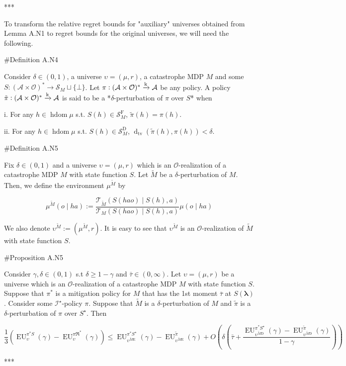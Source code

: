 \documentclass[a4paper]{article}
\newcommand{\AP}[1]{\left(#1\right)}
\newcommand{\Dtva}[1]{\operatorname{d}_{\text{tv}}\AP{#1}}
\newcommand{\Estr}{\boldsymbol{\lambda}}
\newcommand{\M}{\xrightarrow{\textnormal{k}}}
\newcommand{\Ob}{\mathcal{O}}
\newcommand{\A}{\mathcal{A}}
\newcommand{\St}{\mathcal{S}}
\newcommand{\T}{\mathcal{T}}
\newcommand{\In}{\mathcal{I}}
\newcommand{\FH}{(\A \times \Ob)^*}
\DeclareMathOperator{\HD}{hdom}
\newcommand{\RMD}{\mathrm{D}}
\newcommand{\RME}{\mathrm{E}}
\newcommand{\RMF}{\mathrm{F}}
\newcommand{\SF}{\St^{\RMF}}
\newcommand{\SD}{\St^{\RMD}}
\newcommand{\EU}{\operatorname{EU}}
\begin{document}
***

To transform the relative regret bounds for "auxiliary" universes obtained from Lemma A.N1 to regret bounds for the original universes, we will need the following.

\#Definition A.N4

Consider $\delta\in(0,1)$, a universe $\upsilon=(\mu,r)$, a catastrophe MDP $M$ and some $S: \FH \rightarrow \St_M \sqcup \{\bot\}$. Let $\pi: \FH \M \A$ be any policy. A policy $\tilde{\pi}: \FH \M \A$ is said to be a *$\delta$-perturbation of $\pi$ over $S$* when

i. For any $h \in \HD{\mu}$ s.t. $S(h)\in\SF_M$, $\tilde{\pi}(h)=\pi(h)$.

ii. For any $h \in \HD{\mu}$ s.t. $S(h)\in\SD_M$, $\Dtva{\tilde{\pi}(h),\pi(h)} < \delta$.

\#Definition A.N5

Fix $\delta\in(0,1)$ and a universe $\upsilon=(\mu,r)$ which is an $\Ob$-realization of a catastrophe MDP $M$ with state function $S$. Let $\tilde{M}$ be a $\delta$-perturbation of $M$. Then, we define the environment $\mu^{\tilde{M}}$ by

$$\mu^{\tilde{M}}(o \mid ha) := \frac{\T_{\tilde{M}}\AP{S(hao) \mid S(h),a}}{\T_{M}\AP{S(hao) \mid S(h),a}}\mu(o \mid ha)$$

We also denote $\upsilon^{\tilde{M}}:=\AP{\mu^{\tilde{M}},r}$. It is easy to see that $\upsilon^{\tilde{M}}$ is an $\Ob$-realization of $\tilde{M}$ with state function $S$.

\#Proposition A.N5

Consider $\gamma,\delta\in(0,1)$ s.t $\delta \geq 1 - \gamma$ and $\bar{\tau}\in(0,\infty)$. Let $\upsilon=(\mu,r)$ be a universe which is an $\Ob$-realization of a catastrophe MDP $M$ with state function $S$. Suppose that $\pi^*$ is a mitigation policy for $M$ that has the 1st moment $\bar{\tau}$ at $S(\Estr)$. Consider some $\In^\star$-policy $\pi$. Suppose that $\tilde{M}$ is a $\delta$-perturbation of $M$ and $\tilde{\pi}$ is a $\delta$-perturbation of $\pi$ over $S^\star$. Then

$$\frac{1}{3}\AP{\EU_{\upsilon}^{\pi^* S}(\gamma)-\EU_{\upsilon}^{\pi\Re^*}(\gamma)} \leq \EU_{\upsilon^{\tilde{M}\RME}}^{\pi^* S^\star}(\gamma)-\EU_{\upsilon^{\tilde{M}\RME}}^{\tilde{\pi}}(\gamma)   + O\AP{\delta\AP{\bar{\tau}+\frac{\EU_{\upsilon^{\tilde{M}\RMD}}^{\pi^* S^\star}(\gamma)-\EU_{\upsilon^{\tilde{M}\RMD}}^{\tilde{\pi}}(\gamma)}{1-\gamma}}}$$

***
\end{document}
